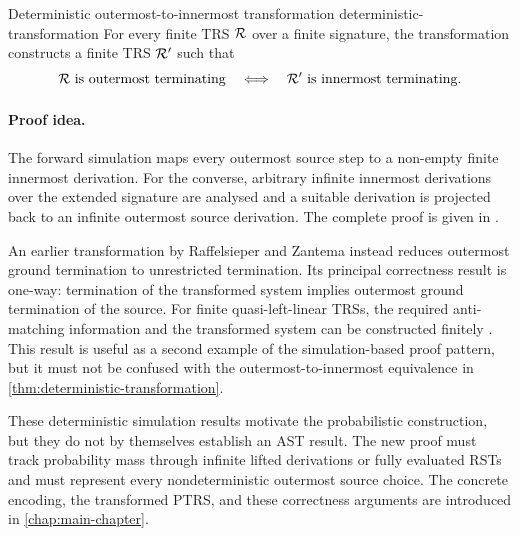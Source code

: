\begin{Theorem}{Deterministic outermost-to-innermost transformation
  \cite{thiemann_2009_outermost}}{deterministic-transformation}
  For every finite TRS $\mathcal{R}$ over a finite signature, the transformation
  constructs a finite TRS $\mathcal{R}'$ such that
  \[
    \mathcal{R}\text{ is outermost terminating}
    \quad\Longleftrightarrow\quad
    \mathcal{R}'\text{ is innermost terminating}.
  \]
\end{Theorem}

\paragraph{Proof idea.}
The forward simulation maps every outermost source step to a non-empty finite
innermost derivation.  For the converse, arbitrary infinite innermost
derivations over the extended signature are analysed and a suitable derivation
is projected back to an infinite outermost source derivation.  The complete
proof is given in \cite{thiemann_2009_outermost}.

An earlier transformation by Raffelsieper and Zantema instead reduces
outermost ground termination to unrestricted termination.  Its principal
correctness result is one-way: termination of the transformed system implies
outermost ground termination of the source.  For finite quasi-left-linear TRSs,
the required anti-matching information and the transformed system can be
constructed finitely \cite{raffelsieper_zantema_2009}.  This result is useful as
a second example of the simulation-based proof pattern, but it must not be
confused with the outermost-to-innermost equivalence in
\cref{thm:deterministic-transformation}.

These deterministic simulation results motivate the probabilistic construction,
but they do not by themselves establish an AST result.  The new proof must
track probability mass through infinite lifted derivations or fully evaluated
RSTs and must represent every nondeterministic outermost source choice.  The concrete
encoding, the transformed PTRS, and these correctness arguments are introduced
in \cref{chap:main-chapter}.
